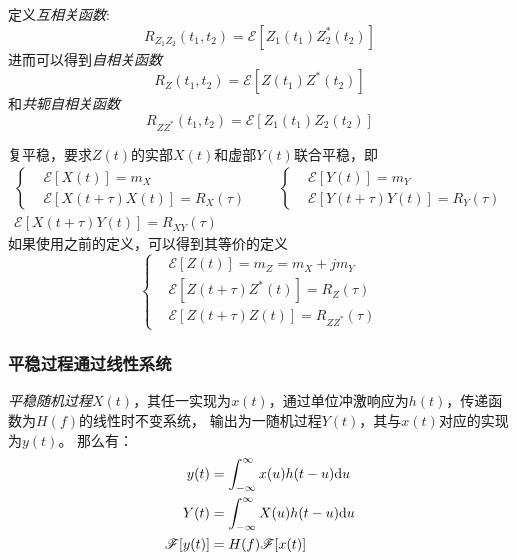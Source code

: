     定义\emph{互相关函数}:
    \begin{equation}
        R_{Z_1Z_2}(t_1,t_2)=\mathscr{E}[Z_1(t_1)Z^*_2(t_2)]
    \end{equation}
    进而可以得到\emph{自相关函数}
    \begin{equation}
        R_{Z}(t_1,t_2)=\mathscr{E}[Z(t_1)Z^*(t_2)]
    \end{equation}
    和\emph{共轭自相关函数}
    \begin{equation}
        R_{ZZ^*}(t_1,t_2)=\mathscr{E}[Z_1(t_1)Z_2(t_2)]
    \end{equation}

    复平稳，要求$Z(t)$的实部$X(t)$和虚部$Y(t)$联合平稳，即
    \begin{equation}
        \begin{split}
            \left\{\begin{aligned}
                &\mathscr{E}[X(t)]=m_X\\
                &\mathscr{E}[X(t+\tau)X(t)]=R_X(\tau)
            \end{aligned}\right.
            \hspace{2em}
            \left\{\begin{aligned}
                &\mathscr{E}[Y(t)]=m_Y\\
                &\mathscr{E}[Y(t+\tau)Y(t)]=R_Y(\tau)
            \end{aligned}\right.\\
            \mathscr{E}[X(t+\tau)Y(t)]=R_{XY}(\tau)\hspace{5em}
        \end{split}
    \end{equation}
    如果使用之前的定义，可以得到其等价的定义
    \begin{equation}
        \left\{\begin{aligned}
            &\mathscr{E}[Z(t)]=m_Z=m_X+jm_Y\\
            &\mathscr{E}[Z(t+\tau)Z^*(t)]=R_Z(\tau)\\
            &\mathscr{E}[Z(t+\tau)Z(t)]=R_{ZZ^*}(\tau)
        \end{aligned}\right.
    \end{equation}

    \subsubsection{平稳过程通过线性系统}\label{subsubsec:LITsystem}
    \emph{平稳随机过程}$X(t)$，其任一实现为$x(t)$，通过单位冲激响应为$h(t)$，传递函数为$H(f)$的线性时不变系统，
    输出为一随机过程$Y(t)$，其与$x(t)$对应的实现为$y(t)$。
    那么有：
    \begin{align}
        y(t)&=\int_{-\infty}^{\infty}x(u)h(t-u)\text{\upshape d} u\\
        Y(t)&=\int_{-\infty}^{\infty}X(u)h(t-u)\text{\upshape d} u \label{eq:stochastic_conv}\\
        \mathscr{F}[y(t)]&=H(f)\mathscr{F}[x(t)]
    \end{align}

